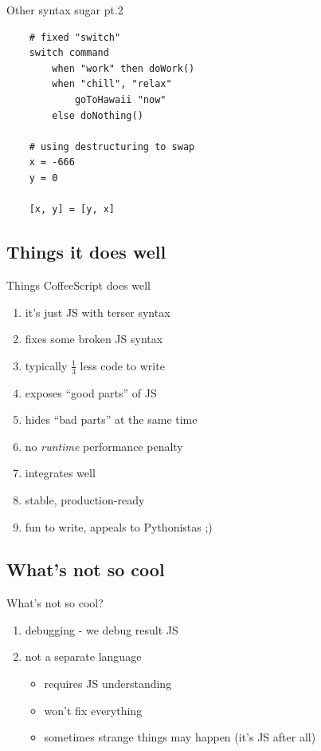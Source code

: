 \documentclass[xcolor=dvipsnames]{beamer}
\newcommand{\slide}[1]{\begin{frame}[fragile]{{#1}}}
\newcommand{\coffee}{\begin{verbatim}}
\begin{document}
\slide{Other syntax sugar pt.2}

    \coffee
    # fixed "switch"
    switch command
        when "work" then doWork()
        when "chill", "relax"
            goToHawaii "now"
        else doNothing()

    # using destructuring to swap
    x = -666
    y = 0

    [x, y] = [y, x]
    \end{verbatim}
\end{frame}


\subsection{Things it does well}
\slide{Things CoffeeScript does well}
    \begin{enumerate}
        \item it's just JS with terser syntax
        \item fixes some broken JS syntax
        \item typically $\frac{1}{3}$ less code to write
        \item exposes ``good parts'' of JS
        \item hides ``bad parts'' at the same time
        \item no \emph{runtime} performance penalty
        \item integrates well
        \item stable, production-ready
        \item fun to write, appeals to Pythonistas ;)
    \end{enumerate}
\end{frame}


\subsection{What's not so cool}
\slide{What's not so cool?}
    \begin{enumerate}
        \item debugging - we debug result JS
        \item not a separate language
            \begin{itemize}
                \item requires JS understanding
                \item won't fix everything
                \item sometimes strange things may happen (it's JS after all)
            \end{itemize}
    \end{enumerate}
\end{frame}
\end{document}
